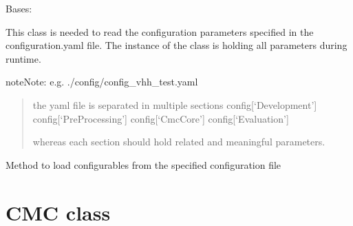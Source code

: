 \documentclass[letterpaper,10pt,english,openany,oneside]{sphinxmanual}
\begin{document}
\begin{fulllineitems}
\label{\detokenize{Configuration:cmc.Configuration.Configuration}}
Bases: 

This class is needed to read the configuration parameters specified in the configuration.yaml file.
The instance of the class is holding all parameters during runtime.

\begin{sphinxadmonition}{note}{Note:}
e.g. ./config/config\_vhh\_test.yaml
\begin{quote}

the yaml file is separated in multiple sections
config{[}‘Development’{]}
config{[}‘PreProcessing’{]}
config{[}‘CmcCore’{]}
config{[}‘Evaluation’{]}

whereas each section should hold related and meaningful parameters.
\end{quote}
\end{sphinxadmonition}

\begin{fulllineitems}
\label{\detokenize{Configuration:cmc.Configuration.Configuration.loadConfig}}
Method to load configurables from the specified configuration file

\end{fulllineitems}


\end{fulllineitems}



\section{CMC class}
\label{\detokenize{CMC:cmc-class}}\label{\detokenize{CMC::doc}}
\end{document}
